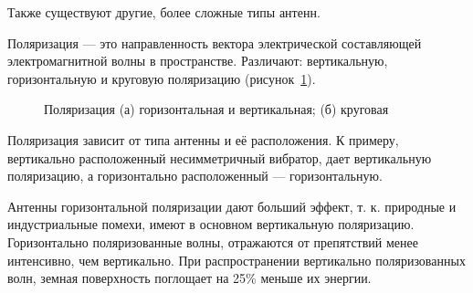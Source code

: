 Также существуют другие, более сложные типы антенн.

Поляризация --- это направленность вектора электрической составляющей электромагнитной волны в пространстве. Различают: вертикальную, горизонтальную и круговую поляризацию (рисунок~\ref{fig:polarization}).

\begin{figure}[ht]
    \caption{Поляризация (а) горизонтальная и вертикальная; (б) круговая}
    \label{fig:polarization}
\end{figure}

Поляризация зависит от типа антенны и её расположения. К примеру, вертикально расположенный несимметричный вибратор, дает вертикальную поляризацию, а горизонтально расположенный --- горизонтальную.

Антенны горизонтальной поляризации дают больший эффект, т. к. природные и индустриальные помехи, имеют в основном вертикальную поляризацию. Горизонтально поляризованные волны, отражаются от препятствий менее интенсивно, чем вертикально. При распространении вертикально поляризованных волн, земная поверхность поглощает на 25\% меньше их энергии.
